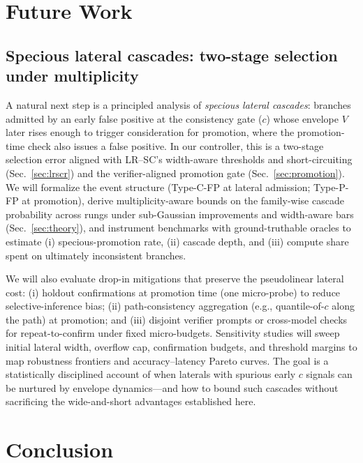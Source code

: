 \documentclass{article}
\begin{document}
\section{Future Work}
\label{section:future-work}

\subsection{Specious lateral cascades: two-stage selection under multiplicity}
\label{subsec:specious-cascades}

A natural next step is a principled analysis of \emph{specious lateral cascades}: branches admitted by an early false positive at the consistency gate (\(c\)) whose envelope \(V\) later rises enough to trigger consideration for promotion, where the promotion-time check also issues a false positive. In our controller, this is a two-stage selection error aligned with LR--SC’s width-aware thresholds and short-circuiting (Sec.~\ref{sec:lrscr}) and the verifier-aligned promotion gate (Sec.~\ref{sec:promotion}). We will formalize the event structure (Type-C-FP at lateral admission; Type-P-FP at promotion), derive multiplicity-aware bounds on the family-wise cascade probability across rungs under sub-Gaussian improvements and width-aware bars (Sec.~\ref{sec:theory}), and instrument benchmarks with ground-truthable oracles to estimate (i) specious-promotion rate, (ii) cascade depth, and (iii) compute share spent on ultimately inconsistent branches.

We will also evaluate drop-in mitigations that preserve the pseudolinear lateral cost: (i) holdout confirmations at promotion time (one micro-probe) to reduce selective-inference bias; (ii) path-consistency aggregation (e.g., quantile-of-\(c\) along the path) at promotion; and (iii) disjoint verifier prompts or cross-model checks for repeat-to-confirm under fixed micro-budgets. Sensitivity studies will sweep initial lateral width, overflow cap, confirmation budgets, and threshold margins to map robustness frontiers and accuracy–latency Pareto curves. The goal is a statistically disciplined account of when laterals with spurious early \(c\) signals can be nurtured by envelope dynamics—and how to bound such cascades without sacrificing the wide-and-short advantages established here.


\section{Conclusion}
\label{section:conclusion}
\end{document}
